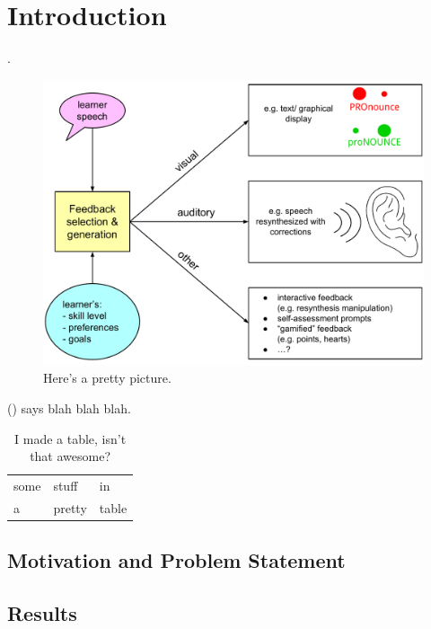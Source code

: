 %
\chapter{Introduction}
\label{sec:intro}


\blindtext \parencite{Duong2011}.

\begin{figure}
\caption{Here's a pretty picture.}
\includegraphics[width=.8\linewidth]{../img/feedback}
\end{figure}

\citeauthor{Sitaram2011} (\citeyear{Sitaram2011}) says blah blah blah.

\begin{table}
\caption{I made a table, isn't that awesome?}
\begin{tabular}{lll}
some & stuff & in \\
a & pretty & table \\
\end{tabular}
\end{table}


\section{Motivation and Problem Statement}
\label{sec:intro:motivation}

\Blindtext[3][1]

\section{Results}
\label{sec:intro:results}

